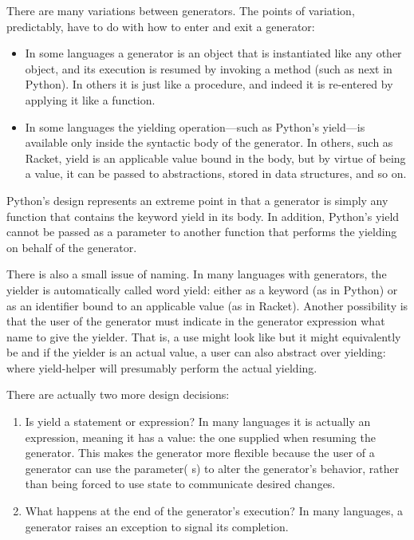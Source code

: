 
There are many variations between generators. The points of variation,
predictably, have to do with how to enter and exit a generator:
\begin{itemize}
  \item 
In some languages a generator is an object that is instantiated like any other
object, and its execution is resumed by invoking a method (such as next in
Python). In others it is just like a procedure, and indeed it is re-entered by
applying it like a function.
  \item 
In some languages the yielding operation—such as Python’s yield—is available
only inside the syntactic body of the generator. In others, such as Racket,
yield is an applicable value bound in the body, but by virtue of being a value,
it can be passed to abstractions, stored in data structures, and so on.
\end{itemize}

Python’s design represents an extreme point in that a generator is simply any
function that contains the keyword yield in its body. In addition, Python’s
yield cannot be passed as a parameter to another function that performs the
yielding on behalf of the generator.

There is also a small issue of naming. In many languages with generators, the
yielder is automatically called word yield: either as a keyword (as in Python)
or as an identifier bound to an applicable value (as in Racket). Another
possibility is that the user of the generator must indicate in the generator
expression what name to give the yielder. That is, a use might look like
but it might equivalently be
and if the yielder is an actual value, a user can also abstract over yielding:
where yield-helper will presumably perform the actual yielding.

There are actually two more design decisions:
\begin{enumerate}
  \item 
Is yield a statement or expression? In many languages it is actually an
expression, meaning it has a value: the one supplied when resuming the
generator. This makes the generator more flexible because the user of a
generator can use the parameter( s) to alter the generator’s behavior, rather
than being forced to use state to communicate desired changes.
  \item 
What happens at the end of the generator’s execution? In many languages, a
generator raises an exception to signal its completion.
\end{enumerate}
